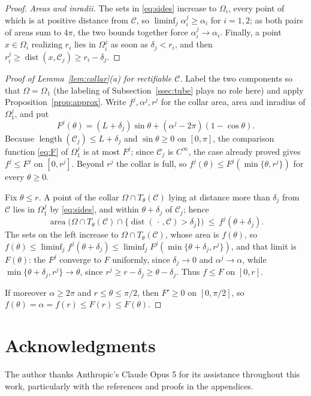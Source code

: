 \documentclass[11pt,oneside,reqno]{amsart}
\theoremstyle{plain}
\theoremstyle{definition}
\DeclareMathOperator{\dist}{dist}
\DeclareMathOperator{\area}{area}
\DeclareMathOperator{\length}{length}
\begin{document}
\begin{proof}
\emph{Areas and inradii.} The sets in \eqref{eq:sides} increase to $\Omega_{i}$,
every point of which is at positive distance from $\mathcal{C}$, so
$\liminf_{j}\alpha_{i}^{j}\ge\alpha_{i}$ for $i=1,2$; as both pairs of areas sum
to $4\pi$, the two bounds together force $\alpha_{i}^{j}\to\alpha_{i}$. Finally,
a point $x\in\Omega_{i}$ realizing $r_{i}$ lies in $\Omega_{i}^{j}$ as soon as
$\delta_{j}<r_{i}$, and then
$r_{i}^{j}\ge\dist(x,\mathcal{C}_{j})\ge r_{i}-\delta_{j}$.
\end{proof}

\begin{proof}[Proof of Lemma~\ref{lem:collar}(a) for rectifiable $\mathcal{C}$]
Label the two components so that $\Omega=\Omega_{1}$ (the labeling of
Subsection~\ref{ssec:tube} plays no role here) and apply
Proposition~\ref{prop:approx}. Write $f^{j},\alpha^{j},r^{j}$ for the collar
area, area and inradius of $\Omega_{1}^{j}$, and put
\[
  F^{j}(\theta)=(L+\delta_{j})\sin\theta+(\alpha^{j}-2\pi)(1-\cos\theta).
\]
Because $\length(\mathcal{C}_{j})\le L+\delta_{j}$ and $\sin\theta\ge0$ on
$[0,\pi]$, the comparison function \eqref{eq:F} of $\Omega_{1}^{j}$ is at most
$F^{j}$; since $\mathcal{C}_{j}$ is $C^{\infty}$, the case already proved
gives $f^{j}\le F^{j}$ on $[0,r^{j}]$. Beyond $r^{j}$ the collar is full, so
$f^{j}(\theta)\le F^{j}(\min\{\theta,r^{j}\})$ for every $\theta\ge0$.

Fix $\theta\le r$. A point of the collar $\Omega\cap T_{\theta}(\mathcal{C})$
lying at distance more than $\delta_{j}$ from $\mathcal{C}$ lies in
$\Omega_{1}^{j}$ by \eqref{eq:sides}, and within $\theta+\delta_{j}$ of
$\mathcal{C}_{j}$; hence
\[
  \area\bigl(\Omega\cap T_{\theta}(\mathcal{C})
    \cap\{\dist(\,\cdot\,,\mathcal{C})>\delta_{j}\}\bigr)
  \ \le\ f^{j}(\theta+\delta_{j}) .
\]
The sets on the left increase to $\Omega\cap T_{\theta}(\mathcal{C})$, whose
area is $f(\theta)$, so
$f(\theta)\le\liminf_{j}f^{j}(\theta+\delta_{j})
\le\liminf_{j}F^{j}(\min\{\theta+\delta_{j},r^{j}\})$, and that limit is
$F(\theta)$: the $F^{j}$ converge to $F$ uniformly, since $\delta_{j}\to0$ and
$\alpha^{j}\to\alpha$, while $\min\{\theta+\delta_{j},r^{j}\}\to\theta$, since
$r^{j}\ge r-\delta_{j}\ge\theta-\delta_{j}$. Thus $f\le F$ on $[0,r]$.

If moreover $\alpha\ge2\pi$ and $r\le\theta\le\pi/2$, then $F'\ge0$ on
$[0,\pi/2]$, so $f(\theta)=\alpha=f(r)\le F(r)\le F(\theta)$.
\end{proof}

\section*{Acknowledgments}

The author thanks Anthropic's Claude Opus 5 for its assistance throughout this
work, particularly with the references and proofs in the appendices.



\end{document}
